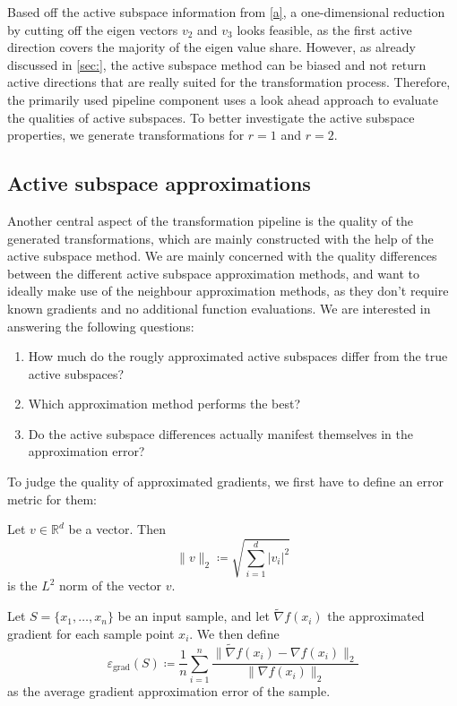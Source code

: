 \documentclass[
  a4paper,  %
  twoside,  %
  bibliography=totoc,
  headsepline,
  cleardoublepage=empty,
  parskip=half,
  draft=false
]{scrbook}
\begin{document}
Based off the active subspace information from \cref{a}, a one-dimensional reduction by cutting off the eigen vectors $v_2$ and $v_3$ looks feasible, as the first active direction covers the majority of the eigen value share.
However, as already discussed in \cref{sec:}, the active subspace method can be biased and not return active directions that are really suited for the transformation process.
Therefore, the primarily used pipeline component uses a look ahead approach to evaluate the qualities of active subspaces.
To better investigate the active subspace properties, we generate transformations for $r=1$ and $r=2$.

\subsection{Active subspace approximations}

Another central aspect of the transformation pipeline is the quality of the generated transformations, which are mainly constructed with the help of the active subspace method.
We are mainly concerned with the quality differences between the different active subspace approximation methods, and want to ideally make use of the neighbour approximation methods, as they don't require known gradients and no additional function evaluations.
We are interested in answering the following questions:
\begin{enumerate}
\item How much do the rougly approximated active subspaces differ from the true active subspaces?
\item Which approximation method performs the best?
\item Do the active subspace differences actually manifest themselves in the approximation error?
\end{enumerate}

To judge the quality of approximated gradients, we first have to define an error metric for them:
\begin{definition}[$L^2$ norm]
Let $v \in \mathds{R}^{d}$ be a vector. Then
\begin{equation}
\| v\|_2 \coloneqq \sqrt{\sum_{i=1}^d |v_{i}|^2}
\nonumber
\end{equation}
is the $L^2$ norm of the vector $v$.
\end{definition}


\begin{definition}
Let $S=\{x_1, \dots, x_n\}$ be an input sample, and let $\widetilde{\nabla} f(x_i)$ the approximated gradient for each sample point $x_i$. We then define
\begin{equation}
\varepsilon_{\text{grad}}(S) \coloneqq \frac{1}{n} \sum_{i=1}^n \frac{\| \widetilde{\nabla} f(x_i) - \nabla f(x_i) \|_2}{\| \nabla f(x_i) \|_2}
\label{eq:e_grad}
\end{equation}
as the average gradient approximation error of the sample.
\end{definition}
\end{document}
